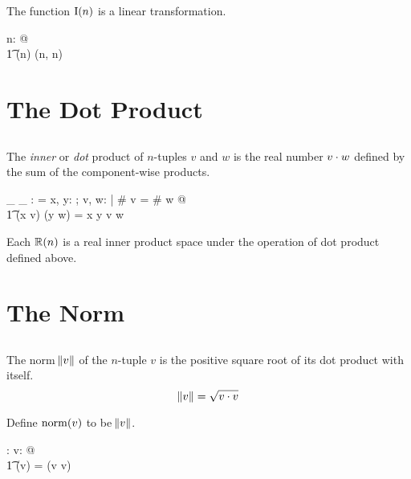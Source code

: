 \documentclass[11pt, oneside]{article}
\begin{document}
\begin{remark}
The function $\operatorname{I}(n)$ is a linear transformation.

\begin{zed}
	\forall n: \nat @ \\
	\t1	\In(n) \in \linR(n, n)
\end{zed}

\end{remark}

\section{The Dot Product}

\subsection{}

The {\it inner} or {\it dot} product of $n$-tuples $v$ and $w$ is the real number $v \mathbin{\cdot} w$ defined by the sum of the component-wise products.

\begin{axdef}
	\_ \dotR \_ : \Rdelta \fun \R
\where
	\langle \rangle \dotR \langle \rangle = \zeroR
\also
	\forall x, y: \R; v, w: \Rinf | \# v = \# w @ \\
	\t1	(\langle x \rangle \cat v) \dotR (\langle y \rangle \cat w) = x \mulR y \addR v \dotR w
\end{axdef}

Each $\mathbb{R}(n)$ is a real inner product space under the operation of dot product defined above.

\section{The Norm}

\subsection{}

The norm $\norm{v}$ of the $n$-tuple $v$ is the positive square root of its dot product with itself.
$$
	\norm{v} = \sqrt{v \mathbin{\cdot} v}
$$

Define $\operatorname{norm}(v)$ to be $\norm{v}$.
\begin{axdef}
	\normR: \Rinf \fun \R
\where
	\forall v: \Rinf @ \\
	\t1	\normR(v) = \sqrtR(v \dotR v)
\end{axdef}
\end{document}
